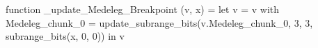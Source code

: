 function _update_Medeleg_Breakpoint (v, x) = let v = { v with Medeleg_chunk_0 = update_subrange_bits(v.Medeleg_chunk_0, 3, 3, subrange_bits(x, 0, 0)) } in
  v
